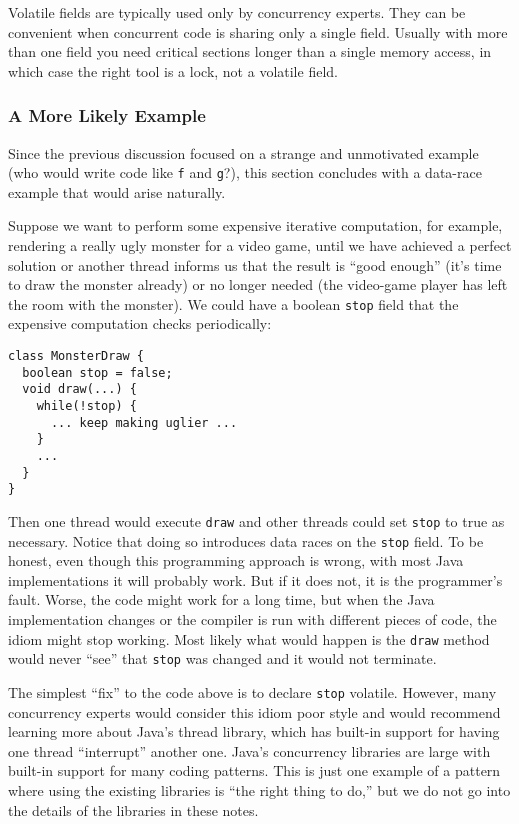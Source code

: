 \documentclass[10pt]{article}
\begin{document}
Volatile fields are typically used only by concurrency experts.  They
can be convenient when concurrent code is sharing only a single
field.  Usually with more than one field you need critical sections
longer than a single memory access, in which case the right tool is a
lock, not a volatile field.

\subsubsection{A More Likely Example}

Since the previous discussion focused on a strange and unmotivated
example (who would write code like {\tt f} and {\tt g}?), this section
concludes with a data-race example that would arise naturally.

Suppose we want to perform some expensive iterative computation, for
example, rendering a really ugly monster for a video game, until we
have achieved a perfect solution or another thread informs us that the
result is ``good enough'' (it's time to draw the monster already) or
no longer needed (the video-game player has left the room with the
monster).  We could have a boolean {\tt stop} field that the expensive
computation checks periodically:
\begin{verbatim}
class MonsterDraw {
  boolean stop = false;
  void draw(...) {
    while(!stop) {
      ... keep making uglier ...
    }
    ...
  }
}
\end{verbatim}
Then one thread would execute {\tt draw} and other threads could set
{\tt stop} to true as necessary.  Notice that doing so introduces data
races on the {\tt stop} field.  To be honest, even though this
programming approach is wrong, with most Java implementations it will
probably work.  But if it does not, it is the programmer's fault.
Worse, the code might work for a long time, but when the Java
implementation changes or the compiler is run with different pieces of
code, the idiom might stop working.  Most likely what would happen is
the {\tt draw} method would never ``see'' that {\tt stop} was changed
and it would not terminate.

The simplest ``fix'' to the code above is to declare {\tt stop}
volatile.  However, many concurrency experts would consider this idiom
poor style and would recommend learning more about Java's thread
library, which has built-in support for having one thread
``interrupt'' another one.  Java's concurrency libraries are large
with built-in support for many coding patterns.  This is just one
example of a pattern where using the existing libraries is ``the right
thing to do,'' but we do not go into the details of the libraries in
these notes.
\end{document}

